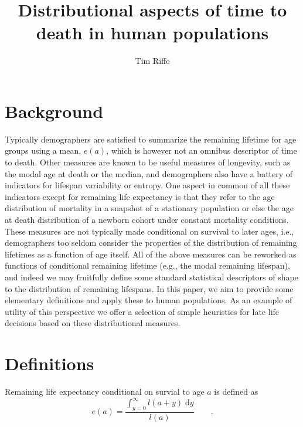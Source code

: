 \documentclass{article}
\newcommand{\dd}{\; \mathrm{d}}
\newcommand{\tp}{\quad\quad\text{.}}
\begin{document}
\title{Distributional aspects of time to death in human populations}
\author{Tim Riffe}
\maketitle

\section{Background}

Typically demographers are satisfied to summarize the remaining lifetime for age
groups using a mean, $e(a)$, which is however not an omnibus descriptor of time
to death. Other measures are known to be useful measures of longevity, such as
the modal age at death or the median, and demographers also have a battery of
indicators for lifespan variability or entropy. One aspect in common of all
these indicators except for remaining life expectancy is that they refer to the
age distribution of mortality in a snapshot of a stationary population or else
the age at death distribution of a newborn cohort under constant mortality
conditions. These measures are not typically made conditional on survival to
later ages, i.e., demographers too seldom consider the properties of the
distribution of remaining lifetimes as a function of age itself. All of
the above measures can be reworked as functions of conditional remaining
lifetime (e.g., the modal remaining lifespan), and indeed we may fruitfully define some standard
statistical descriptors of shape to the distribution of remaining lifespans. In
this paper, we aim to provide some elementary definitions and apply these to
human populations. As an example of utility of this perspective we offer a
selection of simple heuristics for late life decisions based on these
distributional measures.

\section{Definitions}

Remaining life expectancy conditional on survial to age $a$ is defined as
\begin{equation}
e(a) = \frac{\int_{y=0}^\infty l(a+y) \dd y}{l(a)} \tp
\end{equation}
\end{document}
